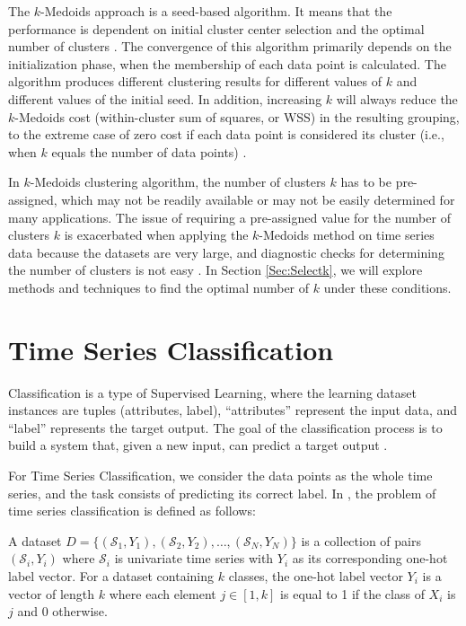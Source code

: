 The $k$-Medoids approach is a seed-based algorithm. It means that the performance is dependent on initial cluster center selection and the optimal number of clusters \cite{Chowdhury2019}. The convergence of this algorithm primarily depends on the initialization phase, when the membership of each data point is calculated. The algorithm produces different clustering results for different values of $k$ and different values of the initial seed. In addition, increasing $k$ will always reduce the $k$-Medoids cost (within-cluster sum of squares, or WSS) in the resulting grouping, to the extreme case of zero cost if each data point is considered its cluster (i.e., when $k$ equals the number of data points) \cite{HastieTF2009}. 

In $k$-Medoids clustering algorithm, the number of clusters $k$ has to be pre-assigned, which may not be readily available or may not be easily determined for many applications. The issue of requiring a pre-assigned value for the number of clusters $k$ is exacerbated when applying the $k$-Medoids method on time series data because the datasets are very large, and diagnostic checks for determining the number of clusters is not easy \cite{Aghabozorgi2015}. In Section \ref{Sec:Selectk}, we will explore methods and techniques to find the optimal number of $k$ under these conditions.

\section{Time Series Classification} 
\label{Sec:TimeSeriesClassification}

Classification is a type of Supervised Learning, where the learning dataset instances are tuples (attributes, label), ``attributes'' represent the input data, and ``label'' represents the target output. The goal of the classification process is to build a system that, given a new input, can predict a target output \cite{Mohri2012}. 

For Time Series Classification, we consider the data points as the whole time series, and the task consists of predicting its correct label. In \cite{Fawaz2019}, the problem of time series classification is defined as follows: 

\begin{definition}
A dataset $D=\{(\mathcal{S}_1,Y_1),(\mathcal{S}_2,Y_2), \ldots ,(\mathcal{S}_N,Y_N)\}$ is a collection of pairs $(\mathcal{S}_i,Y_i)$ where $\mathcal{S}_i$ is univariate time series with $Y_i$ as its corresponding one-hot label vector.  For a dataset containing $k$ classes, the one-hot label vector $Y_i$ is a vector of length $k$ where each element $j \in [1,k]$ is equal to 1 if the class of $X_i$ is $j$ and $0$ otherwise.
\end{definition}

